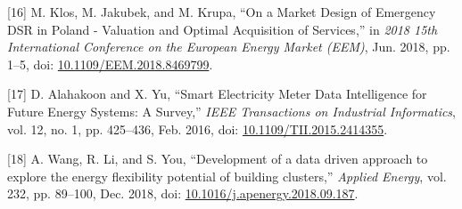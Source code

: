 \begin{cslreferences}
\leavevmode\hypertarget{ref-klos_market_2018}{}%
{[}16{]} M. Klos, M. Jakubek, and M. Krupa, ``On a Market Design of
Emergency DSR in Poland - Valuation and Optimal Acquisition of
Services,'' in \emph{2018 15th International Conference on the European
Energy Market (EEM)}, Jun. 2018, pp. 1--5, doi:
\href{https://doi.org/10.1109/EEM.2018.8469799}{10.1109/EEM.2018.8469799}.

\leavevmode\hypertarget{ref-alahakoon_smart_2016}{}%
{[}17{]} D. Alahakoon and X. Yu, ``Smart Electricity Meter Data
Intelligence for Future Energy Systems: A Survey,'' \emph{IEEE
Transactions on Industrial Informatics}, vol. 12, no. 1, pp. 425--436,
Feb. 2016, doi:
\href{https://doi.org/10.1109/TII.2015.2414355}{10.1109/TII.2015.2414355}.

\leavevmode\hypertarget{ref-wang_development_2018}{}%
{[}18{]} A. Wang, R. Li, and S. You, ``Development of a data driven
approach to explore the energy flexibility potential of building
clusters,'' \emph{Applied Energy}, vol. 232, pp. 89--100, Dec. 2018,
doi:
\href{https://doi.org/10.1016/j.apenergy.2018.09.187}{10.1016/j.apenergy.2018.09.187}.
\end{cslreferences}
